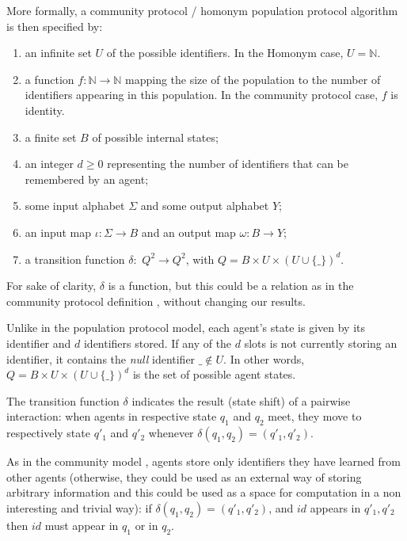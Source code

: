 \documentclass[UKenglish]{llncs}
\newcommand\N{\mathbb{N}}
\newcommand\idd{identifiers}
\begin{document}
More formally, a  community  protocol / homonym population protocol
algorithm is then specified by:
\begin{enumerate}
\item an infinite set $U$ of the possible identifiers.
In the Homonym case, $U=\mathbb{N}$.
\item a function $f: \N \to \N$ mapping the size of the population to the number of \idd{}  appearing in this population. In the community
protocol case, $f$ is identity. 
\item a finite set $B$ of possible internal states;
\item an integer $d \ge 0$ representing the number of  {identifier}s that can be
  remembered by an agent;
\item some input alphabet $\Sigma$ and some output alphabet $Y$;
\item an input map $\iota : \Sigma\rightarrow B$ and an output map $\omega: B\rightarrow Y$;
\item a transition function  $\delta:$ $Q^2\rightarrow Q^2$, with
  $Q=B\times U \times (U
  \cup \{\_\})^d$.
\end{enumerate}

\begin{remark}
For sake of clarity,  $\delta$ is a function, but this could be a relation as in the community protocol definition
\cite{guerraoui2009names}, without changing our results. 
\end{remark}

\begin{remark} Unlike in the population protocol model, each agent's
  state is given by its  identifier and   $d$ identifiers stored.  
If any of the $d$ slots is not currently storing an identifier, it
contains the \emph{null}  identifier $\_ \not\in U$.  In other words,
$Q=B\times U \times (U
  \cup \{\_\})^d$ is the set
of possible agent states.  
\end{remark}

The transition function $\delta$  indicates the
result (state shift) of a pairwise interaction: when agents in respective state
$q_1$ and $q_2$ meet, they move to respectively state $q'_1$ and
$q'_2$ whenever $\delta(q_1,q_2)=(q'_1,q'_2)$.

As in the community model \cite{guerraoui2009names},  agents store only  identifiers
they have learned from other agents (otherwise, they could be used as
an external way of storing arbitrary information and this could be used as
a space for computation in a non interesting and trivial way): 
if $\delta(q_1,q_2)=(q'_1,q'_2)$, and $id$ appears in
  $q'_1,q'_2$ then $id$ must appear in $q_1$ or in $q_2$.
\end{document}
